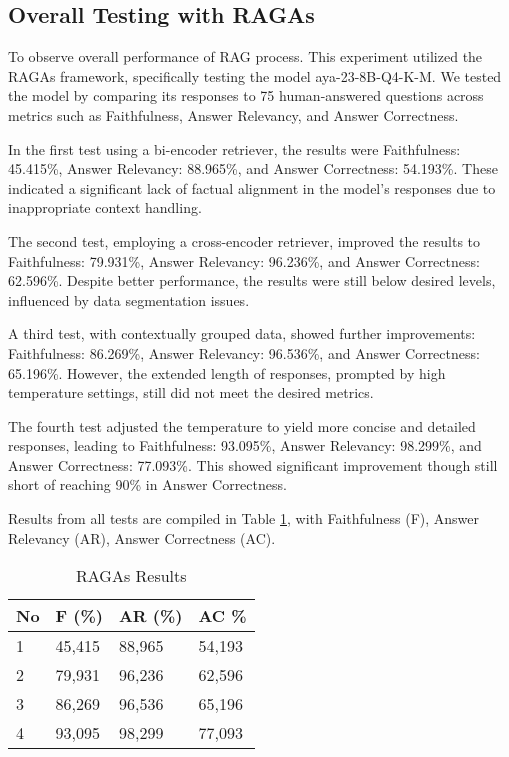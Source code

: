 \subsection{Overall Testing with RAGAs}
To observe overall performance of RAG process. This experiment utilized the RAGAs framework, specifically testing the model aya-23-8B-Q4-K-M. We tested the model by comparing its responses to 75 human-answered questions across metrics such as Faithfulness, Answer Relevancy, and Answer Correctness.

In the first test using a bi-encoder retriever, the results were Faithfulness: 45.415\%, Answer Relevancy: 88.965\%, and Answer Correctness: 54.193\%. These indicated a significant lack of factual alignment in the model's responses due to inappropriate context handling.

The second test, employing a cross-encoder retriever, improved the results to Faithfulness: 79.931\%, Answer Relevancy: 96.236\%, and Answer Correctness: 62.596\%. Despite better performance, the results were still below desired levels, influenced by data segmentation issues.

A third test, with contextually grouped data, showed further improvements: Faithfulness: 86.269\%, Answer Relevancy: 96.536\%, and Answer Correctness: 65.196\%. However, the extended length of responses, prompted by high temperature settings, still did not meet the desired metrics.

The fourth test adjusted the temperature to yield more concise and detailed responses, leading to Faithfulness: 93.095\%, Answer Relevancy: 98.299\%, and Answer Correctness: 77.093\%. This showed significant improvement though still short of reaching 90\% in Answer Correctness.


Results from all tests are compiled in Table \ref{tab:hasilragas}, with Faithfulness (F), Answer Relevancy (AR), Answer Correctness (AC).


\begin{table}[!htbp]
  \caption{RAGAs Results}
  \label{tab:hasilragas}
  \centering
  \begin{tabular}{llll}
    \toprule
    No & F (\%) & AR (\%) & AC {\%} \\
    \midrule
    1& 45,415  & 88,965 & 54,193 \\
    2& 79,931 & 96,236 & 62,596 \\
    3& 86,269 & 96,536 & 65,196 \\
    4& 93,095 & 98,299 & 77,093 \\
    \bottomrule
  \end{tabular}
\end{table}

